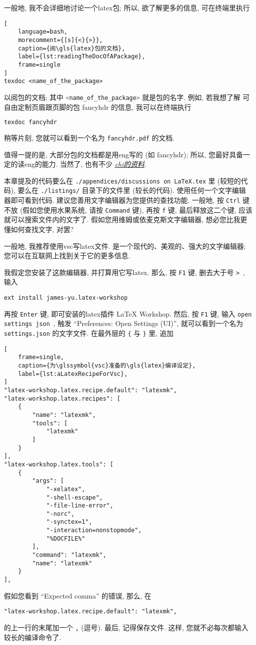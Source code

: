 一般地, 我不会详细地讨论一个\gls{latex}包;
所以, 欲了解更多的信息, 可在终端里执行
\begin{lstlisting}[
    language=bash,
    morecomment={[s]{<}{>}},
    caption={阅\gls{latex}包的文档},
    label={lst:readingTheDocOfAPackage},
    frame=single
]
texdoc <name_of_the_package>
\end{lstlisting}
以阅包的文档;
其中
\lstinline[language=bash,morecomment={[s]{<}{>}}]`<name_of_the_package>`
就是包的名字.
例如,
若我想了解%
可自由定制页眉跟页脚的包 \textsf{fancyhdr} 的信息,
我可以在终端执行
\begin{lstlisting}[language=bash,morecomment={[s]{<}{>}}]
texdoc fancyhdr
\end{lstlisting}
稍等片刻, 您就可以看到一个名为 \verb`fancyhdr.pdf` 的文档.

值得一提的是,
大部分包的文档都是用\gls{eng}写的 (如 \textsf{fancyhdr});
所以, 您最好具备一定的读\gls{eng}的能力.
当然了, 也有不少%
\href{https://ctan.org/topic/chinese-doc}{\emph{\gls{chi}的资料}}.

本章提及的代码要么在
\verb`./appendices/discussions on LaTeX.tex` 里 (较短的代码),
要么在 \verb`./listings/` 目录下的文件里 (较长的代码).
使用任何一个文字编辑器即可看到代码.
建议您善用文字编辑器为您提供的查找功能.
一般地, 按 \verb`Ctrl` 键不放
(假如您使用水果系统, 请按 \verb`Command` 键),
再按 \verb`f` 键, 最后释放这二个键,
应该就可以搜索文件内的文字了.
假如您用维姆或依麦克斯文字编辑器,
想必您比我更懂如何查找文字, 对罢?

一般地, 我推荐使用\gls{vsc}写\gls{latex}文件.
是一个现代的、美观的、强大的文字编辑器;
您可以在互联网上找到关于它的更多信息.

我假定您安装了这款编辑器, 并打算用它写\gls{latex}.
那么, 按 \verb`F1` 键, 删去大于号 \verb`>`~, 输入
\begin{lstlisting}
ext install james-yu.latex-workshop
\end{lstlisting}
再按 \verb`Enter` 键,
即可安装的\gls{latex}插件 LaTeX Workshop.
然后, 按 \verb`F1` 键, 输入 \verb`open settings json`~,
触发 ``Preferences: Open Settings (UI)'',
就可以看到一个名为 \verb`settings.json` 的文字文件.
在最外层的 \verb`{` 与 \verb`}` 里, 追加
\begin{lstlisting}[
    frame=single,
    caption={为\glssymbol{vsc}准备的\gls{latex}编译设定},
    label={lst:aLatexRecipeForVsc},
]
"latex-workshop.latex.recipe.default": "latexmk",
"latex-workshop.latex.recipes": [
    {
        "name": "latexmk",
        "tools": [
            "latexmk"
        ]
    }
],
"latex-workshop.latex.tools": [
    {
        "args": [
            "-xelatex",
            "-shell-escape",
            "-file-line-error",
            "-norc",
            "-synctex=1",
            "-interaction=nonstopmode",
            "%DOCFILE%"
        ],
        "command": "latexmk",
        "name": "latexmk"
    }
],
\end{lstlisting}
假如您看到 ``Expected comma'' 的错误, 那么, 在
\begin{lstlisting}
"latex-workshop.latex.recipe.default": "latexmk",
\end{lstlisting}
的上一行的末尾加一个 \verb`,` (逗号).
最后, 记得保存文件.
这样, 您就不必每次都输入较长的编译命令了.

